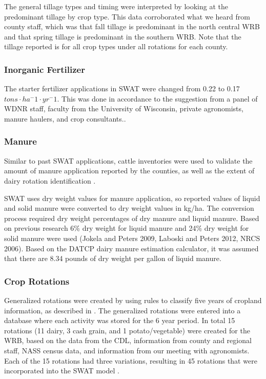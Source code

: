 The general tillage types and timing were interpreted by looking at the predominant tillage by
crop type. This data corroborated what we heard from county staff, which was that
fall tillage is predominant in the north central WRB and that spring tillage is predominant in the
southern WRB. Note that the tillage reported is for all crop types under all rotations for each county.

\subsubsection{Inorganic Fertilizer}

The starter fertilizer applications in SWAT were changed from 0.22 to 0.17 $tons \cdot ha^-1 \cdot yr^-1$. This was done in accordance to the suggestion from a panel of WDNR staff, faculty from the University of Wisconsin, private agronomists, manure haulers, and crop consultants..

\subsubsection{Manure}

Similar to past SWAT applications, cattle inventories were used to validate the amount of manure application reported by the counties, as well as the extent of dairy rotation identification \citep{baumgart_source_2005, freihoefer_mead_2007, timm_swat_2011}.

SWAT uses dry weight values for manure application, so reported values of liquid and solid manure were converted to dry weight values in kg/ha. The conversion process required dry weight percentages of dry manure and liquid manure. Based on previous research 6\% dry weight for liquid manure and 24\% dry weight for solid manure were used (Jokela and Peters 2009, Laboski and Peters 2012, NRCS 2006). Based on the DATCP dairy manure estimation calculator, it was assumed that there are 8.34 pounds of dry weight per gallon of liquid manure.

\subsubsection{Crop Rotations}

Generalized rotations were created by using rules to classify five years of cropland information, as described in .  
The generalized rotations were entered into a database where each activity was stored for the 6 year
period. In total 15 rotations (11 dairy, 3 cash grain, and 1 potato/vegetable) were created for the WRB,
based on the data from the CDL, information from county and regional staff, NASS census data, and
information from our meeting with agronomists. Each of the 15 rotations had three
variations, resulting in 45 rotations that were incorporated into the SWAT model .

